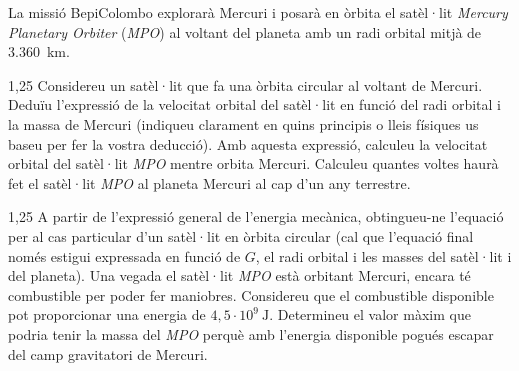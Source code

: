 La missió BepiColombo explorarà Mercuri i posarà en òrbita el satèl·lit \textit{Mercury Planetary Orbiter} (\textit{MPO}) al voltant del planeta amb un radi orbital mitjà de 3.360~km.

\begin{apartat}{1,25}
Considereu un satèl·lit que fa una òrbita circular al voltant de Mercuri. Deduïu l'expressió de la velocitat orbital del satèl·lit en funció del radi orbital i la massa de Mercuri (indiqueu clarament en quins principis o lleis físiques us baseu per fer la vostra deducció). Amb aquesta expressió, calculeu la velocitat orbital del satèl·lit \textit{MPO} mentre orbita Mercuri. Calculeu quantes voltes haurà fet el satèl·lit \textit{MPO} al planeta Mercuri al cap d'un any terrestre.
\end{apartat}

\begin{apartat}{1,25}
A partir de l'expressió general de l'energia mecànica, obtingueu-ne l'equació per al cas particular d'un satèl·lit en òrbita circular (cal que l'equació final només estigui expressada en funció de $G$, el radi orbital i les masses del satèl·lit i del planeta). Una vegada el satèl·lit \textit{MPO} està orbitant Mercuri, encara té combustible per poder fer maniobres. Considereu que el combustible disponible pot proporcionar una energia de $4,5\cdot 10^{9}\ \mathrm{J}$. Determineu el valor màxim que podria tenir la massa del \textit{MPO} perquè amb l'energia disponible pogués escapar del camp gravitatori de Mercuri.
\end{apartat}

